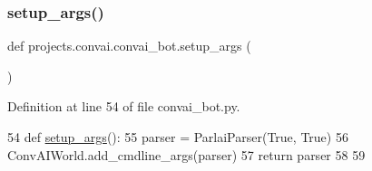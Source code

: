 \subsubsection{\texorpdfstring{setup\+\_\+args()}{setup\_args()}}
{\footnotesize\ttfamily def projects.\+convai.\+convai\+\_\+bot.\+setup\+\_\+args (\begin{DoxyParamCaption}{ }\end{DoxyParamCaption})}



Definition at line 54 of file convai\+\_\+bot.\+py.


\begin{DoxyCode}
54 \textcolor{keyword}{def }\hyperlink{namespaceprojects_1_1convai_1_1convai__bot_abb3f83d4277a55c3f972f0f77d9066a7}{setup\_args}():
55     parser = ParlaiParser(\textcolor{keyword}{True}, \textcolor{keyword}{True})
56     ConvAIWorld.add\_cmdline\_args(parser)
57     \textcolor{keywordflow}{return} parser
58 
59 
\end{DoxyCode}
